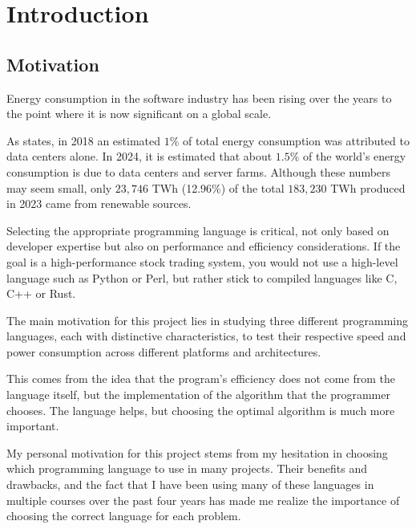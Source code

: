 \chapter{Introduction}\label{chap:introduction}



\section{Motivation}\label{sec:motivation}
Energy consumption in the software industry has been rising over the years to the point where it is now significant on a global scale. %

As \cite{recalibrating-datacenter} states, in 2018 an estimated $1\%$ of total energy consumption was attributed to data centers alone. In 2024, it is estimated that about $1.5\%$ of the world's energy consumption is due to data centers and server farms. Although these numbers may seem small, only $23,746$ TWh (12.96\%) of the total $183,230$ TWh produced in 2023 \cite{energy-production-consumption} came from renewable sources.

Selecting the appropriate programming language is critical, not only based on developer expertise but also on performance and efficiency considerations. If the goal is a high-performance stock trading system, you would not use a high-level language such as Python or Perl, but rather stick to compiled languages like C, C++ or Rust.

The main motivation for this project lies in studying three different programming languages, each with distinctive characteristics, to test their respective speed and power consumption across different platforms and architectures.

This comes from the idea that the program's efficiency does not come from the language itself, but the implementation of the algorithm that the programmer chooses. The language helps, but choosing the optimal algorithm is much more important.

My personal motivation for this project stems from my hesitation in choosing which programming language to use in many projects. Their benefits and drawbacks, and the fact that I have been using many of these languages in multiple courses over the past four years has made me realize the importance of choosing the correct language for each problem.


